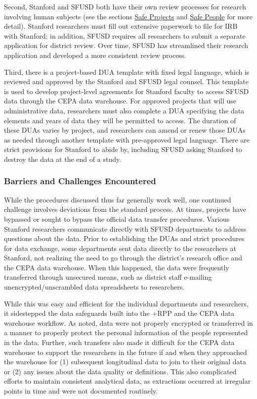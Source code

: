 \documentclass[
]{book}
\begin{document}
Second, Stanford and SFUSD both have their own review processes for research involving human subjects (see the sections \protect\hyperlink{safe-projects-8}{Safe Projects} and \protect\hyperlink{safe-people-8}{Safe People} for more detail). Stanford researchers must fill out extensive paperwork to file for IRB with Stanford; in addition, SFUSD requires all researchers to submit a separate application for district review. Over time, SFUSD has streamlined their research application and developed a more consistent review process.

Third, there is a project-based DUA template with fixed legal language, which is reviewed and approved by the Stanford and SFUSD legal counsel. This template is used to develop project-level agreements for Stanford faculty to access SFUSD data through the CEPA data warehouse. For approved projects that will use administrative data, researchers must also complete a DUA specifying the data elements and years of data they will be permitted to access. The duration of these DUAs varies by project, and researchers can amend or renew those DUAs as needed through another template with pre-approved legal language. There are strict provisions for Stanford to abide by, including SFUSD asking Stanford to destroy the data at the end of a study.

\hypertarget{barriers-and-challenges-encountered}{%
\subsubsection{Barriers and Challenges Encountered}\label{barriers-and-challenges-encountered}}

While the procedures discussed thus far generally work well, one continued challenge involves deviations from the standard process. At times, projects have bypassed or sought to bypass the official data transfer procedures. Various Stanford researchers communicate directly with SFUSD departments to address questions about the data. Prior to establishing the DUAs and strict procedures for data exchange, some departments sent data directly to the researchers at Stanford, not realizing the need to go through the district's research office and the CEPA data warehouse. When this happened, the data were frequently transferred through unsecured means, such as district staff e-mailing unencrypted/unscrambled data spreadsheets to researchers.

While this was easy and efficient for the individual departments and researchers, it sidestepped the data safeguards built into the +RPP\textbar{} and the CEPA data warehouse workflow. As noted, data were not properly encrypted or transferred in a manner to properly protect the personal information of the people represented in the data. Further, such transfers also made it difficult for the CEPA data warehouse to support the researchers in the future if and when they approached the warehouse for (1) subsequent longitudinal data to join to their original data or (2) any issues about the data quality or definitions. This also complicated efforts to maintain consistent analytical data, as extractions occurred at irregular points in time and were not documented routinely.
\end{document}
